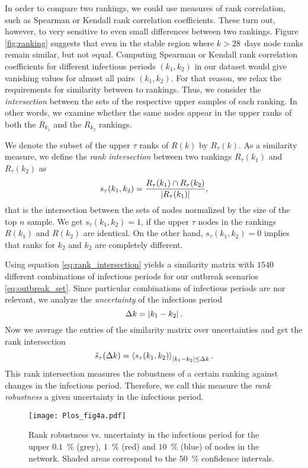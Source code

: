 In order to compare two rankings, we could use measures of rank correlation, such as Spearman or Kendall rank correlation coefficients.
These turn out, however, to very sensitive to even small differences between two rankings.
Figure \ref{fig:ranking} suggests that even in the stable region where $k>28$~days node ranks remain similar, but not equal.
Computing Spearman or Kendall rank correlation coefficients for different infectious periods $(k_1,k_2)$ in our dataset would give vanishing values for almost all pairs $(k_1,k_2)$.
For that reason, we relax the requirements for similarity between to rankings.
Thus, we consider the \emph{intersection} between the sets of the respective upper samples of each ranking.
In other words, we examine whether the same nodes appear in the upper ranks of both the $R_{k_1}$ and the $R_{k_2}$ rankings.

We denote the subset of the upper $\tau $ ranks of $R(k)$ by $R_\tau (k)$.
As a similarity measure, we define the \emph{rank intersection} between two rankings $R_\tau (k_1)$ and $R_\tau (k_2)$ as
\begin{equation}\label{eq:rank_intersection}
s_\tau (k_1,k_2)=\frac{R_\tau (k_1) \cap R_\tau (k_2)}{\left| R_\tau (k_1) \right|},
\end{equation}
that is the intersection between the sets of nodes normalized by the size of the top $n$ sample.
We get $s_\tau (k_1,k_2) =1$, if the upper $\tau $ nodes in the rankings $R(k_1)$ and $R(k_2)$ are identical.
On the other hand, $s_\tau (k_1,k_2) =0$ implies that ranks for $k_2$ and $k_2$ are completely different.

Using equation \eqref{eq:rank_intersection} yields a similarity matrix with $1540$ different combinations of infectious periods for our outbreak scenarios \eqref{eq:outbreak_set}.
Since particular combinations of infectious periods are nor relevant, we analyze the \emph{uncertainty} of the infectious period
\begin{equation}\label{eq:uncertainty_k}
\Delta k= \left| k_1-k_2 \right| .
\end{equation}
Now we average the entries of the similarity matrix over uncertainties and get the rank intersection
\begin{equation}\label{eq:robustness_k}
\tilde{s}_\tau (\Delta k)=\left< s_\tau (k_1,k_2) \right>_{\left| k_1-k_2 \right|\leq \Delta k} .
\end{equation}
This rank intersection measures the robustness of a certain ranking against changes in the infectious period.
Therefore, we call this measure the \emph{rank robustness} a given uncertainty in the infectious period.
%
\begin{SCfigure}
\texttt{[image: Plos\_fig4a.pdf]}
\caption{Rank robustness vs. uncertainty in the infectious period for the upper $0.1$~\% (grey), $1$~\% (red) and $10$~\% (blue) of nodes in the network.
Shaded areas correspond to the $50$~\% confidence intervals.}
\label{fig:plos_fig4a}
\end{SCfigure}

